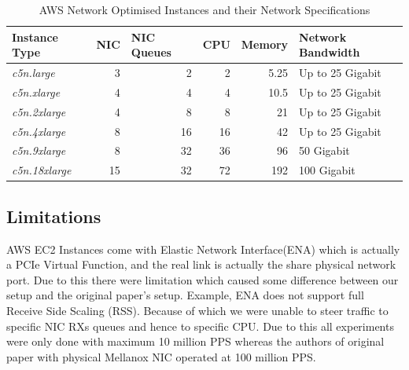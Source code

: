 \documentclass[12pt,titlepage]{article}
\begin{document}
\begin{table}[]
\begin{tabular}{|l|r|r|r|r|l|}
\hline
\textbf{Instance Type} & \multicolumn{1}{l|}{\textbf{NIC}} & \multicolumn{1}{l|}{\textbf{NIC Queues}} & \multicolumn{1}{l|}{\textbf{CPU}} & \multicolumn{1}{l|}{\textbf{Memory}} & \textbf{Network Bandwidth} \\ \hline
\textit{c5n.large}     & 3                                 & 2                                        & 2                                 & 5.25                                 & Up to 25 Gigabit           \\ \hline
\textit{c5n.xlarge}    & 4                                 & 4                                        & 4                                 & 10.5                                 & Up to 25 Gigabit           \\ \hline
\textit{c5n.2xlarge}   & 4                                 & 8                                        & 8                                 & 21                                   & Up to 25 Gigabit           \\ \hline
\textit{c5n.4xlarge}   & 8                                 & 16                                       & 16                                & 42                                   & Up to 25 Gigabit           \\ \hline
\textit{c5n.9xlarge}   & 8                                 & 32                                       & 36                                & 96                                   & 50 Gigabit                 \\ \hline
\textit{c5n.18xlarge}  & 15                                & 32                                       & 72                                & 192                                  & 100 Gigabit                \\ \hline
\end{tabular}
\caption{AWS Network Optimised Instances and their Network Specifications}
\label{tab:aws-table}
\end{table}


\subsection{Limitations}

AWS EC2 Instances come with Elastic Network Interface(ENA) which is actually a PCIe Virtual Function, and the real link is actually the share physical network port. Due to this there were limitation which caused some difference between our setup and the original paper's setup. Example,  ENA does not support full Receive Side Scaling (RSS). Because of which we were unable to steer traffic to specific NIC RXs queues and hence to specific CPU. Due to this all experiments were only done with maximum 10 million PPS whereas the authors of original paper with physical Mellanox NIC operated at 100 million PPS. 
\end{document}

